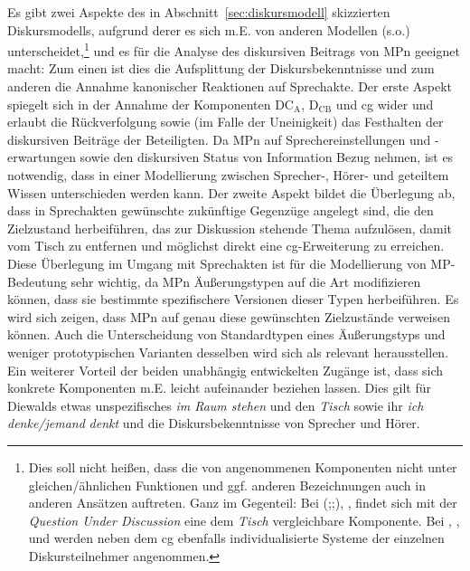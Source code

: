Es gibt zwei Aspekte des in Abschnitt~\ref{sec:diskursmodell} skizzierten Diskursmodells, aufgrund derer es sich m.E. von anderen Modellen (s.o.) unterscheidet,\footnote{Dies soll nicht heißen, dass die von \citet{Farkas2010} angenommenen Komponenten nicht unter gleichen/ähnlichen Funktionen und ggf. anderen Bezeichnungen auch in anderen Ansätzen auftreten. Ganz im Gegenteil: Bei \citeauthor{Ginzburg1995a} (\citeyear{Ginzburg1995a};\citeyear{Ginzburg1995b};\citeyear{Ginzburg1996}), \citet{Roberts1996}, \citet{Buering2003} findet sich mit der \textit{Question Under Discussion} eine dem \textit{Tisch} vergleichbare Komponente. Bei \citet{Hamblin1971}, \citet{Bartels1999}, \citet{Gunlogson2003} und \citet{Caponigro2007} werden neben dem cg ebenfalls individualisierte Systeme der einzelnen Diskursteilnehmer angenommen.} und es für die Analyse des diskursiven Beitrags von MPn geeignet macht: Zum einen ist dies die Aufsplittung der Diskursbekenntnisse und zum anderen die Annahme kano\-nischer Reaktionen auf  Sprechakte. Der erste Aspekt spiegelt sich in der Annahme der Komponenten $\textrm{DC}_{\textrm{A}}$, $\textrm{D}_{\textrm{CB}}$ und cg wider und erlaubt die Rückverfolgung sowie (im Falle der Uneinigkeit) das Festhalten der diskursiven Beiträge der Beteiligten. Da MPn auf Sprechereinstellungen und -erwartungen sowie den diskursiven Status von Information Bezug nehmen, ist es notwendig, dass in einer Modellierung zwischen Sprecher-, Hörer- und geteiltem Wissen unterschieden werden kann. Der zweite Aspekt bildet die Überlegung ab, dass in Sprechakten gewünschte zukünftige Gegenzüge angelegt sind, die den Zielzustand herbeiführen, das zur Diskussion stehende Thema aufzulösen, damit vom Tisch zu entfernen und möglichst direkt eine cg-Erweiterung zu erreichen. Diese Überlegung im Umgang mit Sprechakten ist für die Modellierung von MP-Bedeu\-tung sehr wichtig, da MPn Äußerungstypen auf die Art modifizieren können, dass sie bestimmte spezifischere Versionen dieser Typen herbeiführen. Es wird sich zeigen, dass MPn auf genau diese gewünschten Zielzustände verweisen können. Auch die Unterscheidung von Standardtypen eines Äußerungstyps und weniger prototy\-pischen Varianten desselben wird sich als relevant herausstellen. Ein weiterer Vorteil der beiden unabhängig entwickelten Zugänge ist, dass sich konkrete Komponenten m.E. leicht aufeinander beziehen lassen. Dies gilt für Diewalds etwas unspezifisches \textit{im Raum stehen} und den \textit{Tisch} sowie ihr \textit{ich denke/jemand} \textit{denkt} und die Diskursbekenntnisse von Sprecher und Hörer.

